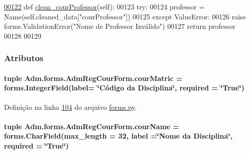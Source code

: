 \begin{DoxyCode}
\hypertarget{classAdm_1_1forms_1_1AdmRegCourForm_l00122}{}\hyperlink{classAdm_1_1forms_1_1AdmRegCourForm_adbe479c6c4b7fa2d51b67b4c6223398f}{00122}     \textcolor{keyword}{def }\hyperlink{classAdm_1_1forms_1_1AdmRegCourForm_adbe479c6c4b7fa2d51b67b4c6223398f}{clean\_courProfessor}(self):
00123         \textcolor{keywordflow}{try}:
00124             professor = Name(self.cleaned\_data[\textcolor{stringliteral}{"courProfessor"}])
00125         \textcolor{keywordflow}{except} ValueError:
00126             \textcolor{keywordflow}{raise} forms.ValidationError(\textcolor{stringliteral}{"Nome de Professor Inválido"})
00127         \textcolor{keywordflow}{return} professor            
00128 
00129 
\end{DoxyCode}


\subsubsection{Atributos}
\hypertarget{classAdm_1_1forms_1_1AdmRegCourForm_a5030e7e3ac46b325e10adc6d39ea9736}{}
\paragraph[{cour\+Matric}]{\setlength{\rightskip}{0pt plus 5cm}tuple Adm.\+forms.\+Adm\+Reg\+Cour\+Form.\+cour\+Matric = forms.\+Integer\+Field(label= \char`\"{}Código da Disciplina\char`\"{}, required = \char`\"{}True\char`\"{})\hspace{0.3cm}{\ttfamily [static]}}\label{classAdm_1_1forms_1_1AdmRegCourForm_a5030e7e3ac46b325e10adc6d39ea9736}


Definição na linha \hyperlink{Adm_2forms_8py_source_l00104}{104} do arquivo \hyperlink{Adm_2forms_8py_source}{forms.\+py}.

\hypertarget{classAdm_1_1forms_1_1AdmRegCourForm_afc325feb749069ea57387630cc0acc5a}{}
\paragraph[{cour\+Name}]{\setlength{\rightskip}{0pt plus 5cm}tuple Adm.\+forms.\+Adm\+Reg\+Cour\+Form.\+cour\+Name = forms.\+Char\+Field(max\+\_\+length = 32, label =\char`\"{}Nome da Disciplina\char`\"{}, required = \char`\"{}True\char`\"{})\hspace{0.3cm}{\ttfamily [static]}}\label{classAdm_1_1forms_1_1AdmRegCourForm_afc325feb749069ea57387630cc0acc5a}


